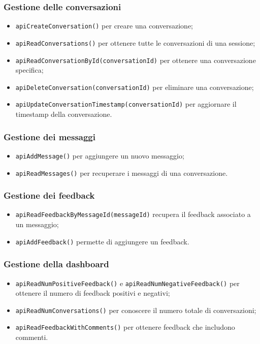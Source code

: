 \subsubsection*{Gestione delle conversazioni}
\begin{itemize}
    \item \texttt{apiCreateConversation()} per creare una conversazione;
    \item \texttt{apiReadConversations()} per ottenere tutte le conversazioni di una sessione;
    \item \texttt{apiReadConversationById(conversationId)} per ottenere una conversazione specifica;
    \item \texttt{apiDeleteConversation(conversationId)} per eliminare una conversazione;
    \item \texttt{apiUpdateConversationTimestamp(conversationId)} per aggiornare il timestamp della conversazione.
\end{itemize}

\subsubsection*{Gestione dei messaggi}
\begin{itemize}
    \item \texttt{apiAddMessage()} per aggiungere un nuovo messaggio;
    \item \texttt{apiReadMessages()} per recuperare i messaggi di una conversazione.
\end{itemize}

\subsubsection*{Gestione dei feedback}
\begin{itemize}
    \item \texttt{apiReadFeedbackByMessageId(messageId)} recupera il feedback associato a un messaggio;
    \item \texttt{apiAddFeedback()} permette di aggiungere un feedback.
\end{itemize}

\subsubsection*{Gestione della dashboard}
\begin{itemize}
    \item \texttt{apiReadNumPositiveFeedback()} e \texttt{apiReadNumNegativeFeedback()} per ottenere il numero di feedback positivi e negativi;
    \item \texttt{apiReadNumConversations()} per conoscere il numero totale di conversazioni;
    \item \texttt{apiReadFeedbackWithComments()} per ottenere feedback che includono commenti.
\end{itemize}

